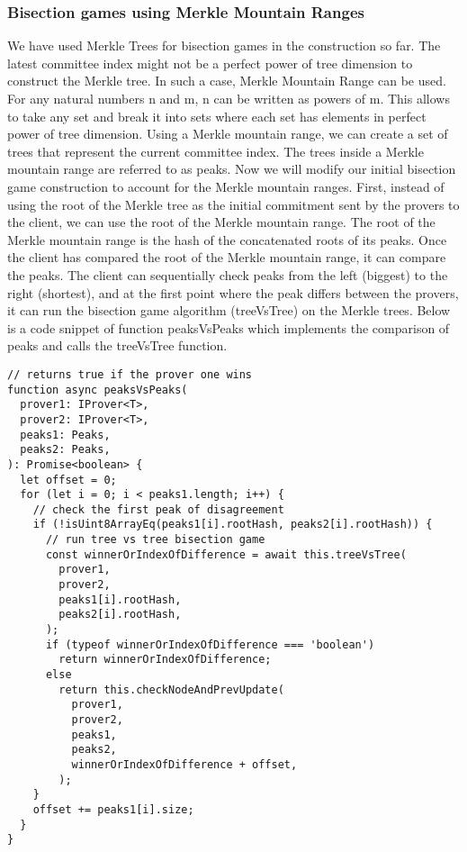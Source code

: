 \documentclass[a4paper,11pt,oneside]{article}
\theoremstyle{definition}
\begin{document}
   \subsubsection{Bisection games using Merkle Mountain Ranges}
   We have used Merkle Trees for bisection games in the construction so far. The latest committee index might not be a perfect power of tree dimension to construct the Merkle tree. In such a case, Merkle Mountain Range can be used. For any natural numbers n and m, n can be written as powers of m. This allows to take any set and break it into sets where each set has elements in perfect power of tree dimension. Using a Merkle mountain range, we can create a set of trees that represent the current committee index. The trees inside a Merkle mountain range are referred to as peaks. Now we will modify our initial bisection game construction to account for the Merkle mountain ranges. First, instead of using the root of the Merkle tree as the initial commitment sent by the provers to the client, we can use the root of the Merkle mountain range. The root of the Merkle mountain range is the hash of the concatenated roots of its peaks. Once the client has compared the root of the Merkle mountain range, it can compare the peaks. The client can sequentially check peaks from the left (biggest) to the right (shortest), and at the first point where the peak differs between the provers, it can run the bisection game algorithm (treeVsTree) on the Merkle trees. Below is a code snippet of function peaksVsPeaks which implements the comparison of peaks and calls the treeVsTree function.  
   \begin{lstlisting}
// returns true if the prover one wins
function async peaksVsPeaks(
  prover1: IProver<T>,
  prover2: IProver<T>,
  peaks1: Peaks,
  peaks2: Peaks,
): Promise<boolean> {
  let offset = 0;
  for (let i = 0; i < peaks1.length; i++) {
    // check the first peak of disagreement
    if (!isUint8ArrayEq(peaks1[i].rootHash, peaks2[i].rootHash)) {
      // run tree vs tree bisection game
      const winnerOrIndexOfDifference = await this.treeVsTree(
        prover1,
        prover2,
        peaks1[i].rootHash,
        peaks2[i].rootHash,
      );
      if (typeof winnerOrIndexOfDifference === 'boolean')
        return winnerOrIndexOfDifference;
      else
        return this.checkNodeAndPrevUpdate(
          prover1,
          prover2,
          peaks1,
          peaks2,
          winnerOrIndexOfDifference + offset,
        );
    }
    offset += peaks1[i].size;
  }
}
   \end{lstlisting}
\end{document}
